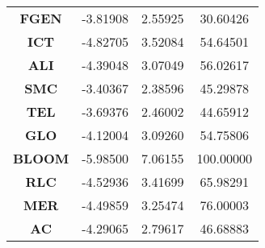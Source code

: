 \begin{longtable}[c]{cccc}
    \textbf{FGEN}  & -3.81908                                                                 & 2.55925                                                             & 30.60426                                                          \\
    \textbf{ICT}   & -4.82705                                                                 & 3.52084                                                             & 54.64501                                                          \\
    \textbf{ALI}   & -4.39048                                                                 & 3.07049                                                             & 56.02617                                                          \\
    \textbf{SMC}   & -3.40367                                                                 & 2.38596                                                             & 45.29878                                                          \\
    \textbf{TEL}   & -3.69376                                                                 & 2.46002                                                             & 44.65912                                                          \\
    \textbf{GLO}   & -4.12004                                                                 & 3.09260                                                             & 54.75806                                                          \\
    \textbf{BLOOM} & -5.98500                                                                 & 7.06155                                                             & 100.00000                                                         \\
    \textbf{RLC}   & -4.52936                                                                 & 3.41699                                                             & 65.98291                                                          \\
    \textbf{MER}   & -4.49859                                                                 & 3.25474                                                             & 76.00003                                                          \\
    \textbf{AC}    & -4.29065                                                                 & 2.79617                                                             & 46.68883                                                          \\

\end{longtable}
